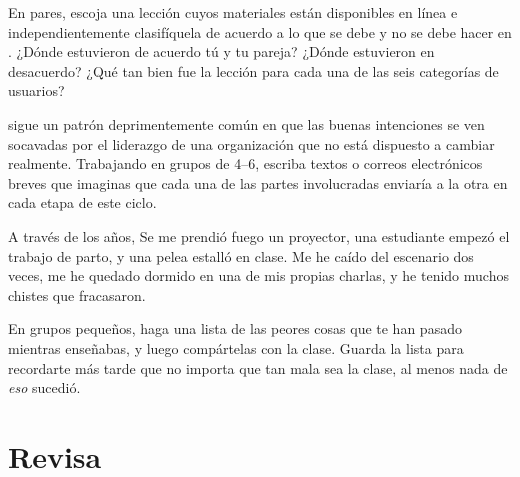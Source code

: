 
En pares,
escoja una lección cuyos materiales están disponibles en línea
e independientemente clasifíquela de acuerdo a lo que se debe y no se debe hacer en
.
¿Dónde estuvieron de acuerdo tú y tu pareja?
¿Dónde estuvieron en desacuerdo?
¿Qué tan bien fue la lección para cada una de las seis categorías de usuarios?


\cite{Coco2018} sigue un patrón deprimentemente común
en que las buenas intenciones se ven socavadas por
el liderazgo de una organización que no está dispuesto a cambiar realmente.
Trabajando en grupos de 4--6,
escriba textos o correos electrónicos breves que imaginas que cada una de las partes involucradas enviaría a la otra
en cada etapa de este ciclo.


A través de los años,
Se me prendió fuego un proyector,
una estudiante empezó el trabajo de parto,
y una pelea estalló en clase.
Me he caído del escenario dos veces,
me he quedado dormido en una de mis propias charlas,
y he tenido muchos chistes que fracasaron.

En grupos pequeños,
haga una lista de las peores cosas que te han pasado mientras enseñabas,
y luego compártelas con la clase.
Guarda la lista para recordarte más tarde que no importa que tan mala sea la clase,
al menos nada de \emph{eso} sucedió.

\section*{Revisa}


